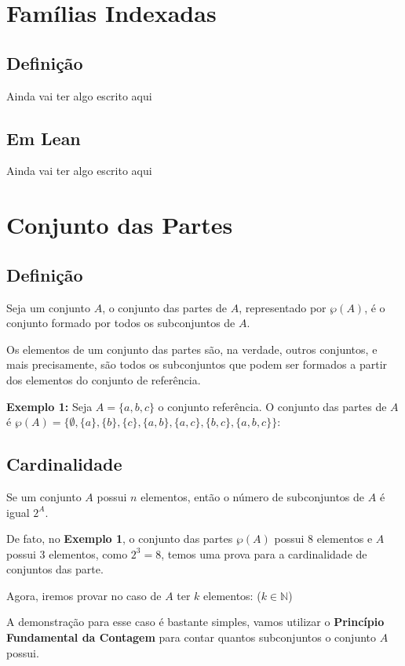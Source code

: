 \section{Famílias Indexadas}

\subsection{Definição}
Ainda vai ter algo escrito aqui

\subsection{Em Lean}
Ainda vai ter algo escrito aqui

\section{Conjunto das Partes}

\subsection{Definição}
Seja um conjunto $A$, o conjunto das partes de $A$, representado por $\wp(A)$, é o conjunto formado por todos os subconjuntos de $A$.

Os elementos de um conjunto das partes são, na verdade, outros conjuntos, e mais precisamente, são todos os subconjuntos que podem ser formados a partir dos elementos do conjunto de referência.

\textbf{Exemplo 1:}  Seja $A = \{a,b,c\}$ o conjunto referência.
O conjunto das partes de $A$ é $\wp(A)
= \{\emptyset,\{a\},\{b\},\{c\},\{a,b\},\{a,c\},\{b,c\},\{a,b,c\}\}$: 

\subsection{Cardinalidade}
Se um conjunto $A$ possui $n$ elementos, então o número de subconjuntos de $A$ é igual $2^A$.

De fato, no \textbf{Exemplo 1}, o conjunto das partes $\wp(A)$ possui 8 elementos e $A$ possui 3 elementos, como $2^3 = 8$, temos uma prova para a cardinalidade de conjuntos das parte.

Agora, iremos provar no caso de $A$ ter $k$ elementos: ($k \in  \mathbb{N}$) 

A demonstração para esse caso é bastante simples, vamos utilizar o \textbf{Princípio Fundamental da Contagem} para contar quantos subconjuntos o conjunto $A$ possui.

